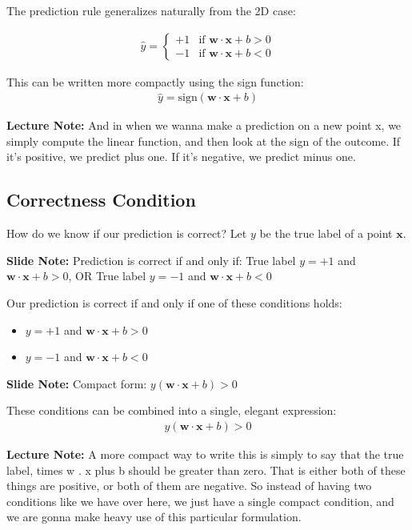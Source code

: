\documentclass{article}
\newcommand{\slidenote}[1]{\begin{mdframed}[backgroundcolor=blue!10, linewidth=0pt]
\textbf{Slide Note:} #1
\end{mdframed}}
\newcommand{\lecturenote}[1]{\begin{mdframed}[backgroundcolor=green!10, linewidth=0pt]
\textbf{Lecture Note:} #1
\end{mdframed}}
\begin{document}
The prediction rule generalizes naturally from the 2D case:

\begin{align}
    \hat{y} = \begin{cases}
    +1 & \text{if } \mathbf{w} \cdot \mathbf{x} + b > 0\\
    -1 & \text{if } \mathbf{w} \cdot \mathbf{x} + b < 0
    \end{cases}
\end{align}

This can be written more compactly using the sign function:
\begin{align}
    \hat{y} = \text{sign}(\mathbf{w} \cdot \mathbf{x} + b)
\end{align}

\lecturenote{And in when we wanna make a prediction on a new point x, we simply compute the linear function, and then look at the sign of the outcome. If it's positive, we predict plus one. If it's negative, we predict minus one.}

\subsection{Correctness Condition}

How do we know if our prediction is correct? Let $y$ be the true label of a point $\mathbf{x}$.

\slidenote{Prediction is correct if and only if: True label $y = +1$ and $\mathbf{w} \cdot \mathbf{x} + b > 0$, OR True label $y = -1$ and $\mathbf{w} \cdot \mathbf{x} + b < 0$}

Our prediction is correct if and only if one of these conditions holds:
\begin{itemize}
    \item $y = +1$ and $\mathbf{w} \cdot \mathbf{x} + b > 0$
    \item $y = -1$ and $\mathbf{w} \cdot \mathbf{x} + b < 0$
\end{itemize}

\slidenote{Compact form: $y(\mathbf{w} \cdot \mathbf{x} + b) > 0$}

These conditions can be combined into a single, elegant expression:
\begin{align}
    y(\mathbf{w} \cdot \mathbf{x} + b) > 0
\end{align}

\lecturenote{A more compact way to write this is simply to say that the true label, times w . x plus b should be greater than zero. That is either both of these things are positive, or both of them are negative. So instead of having two conditions like we have over here, we just have a single compact condition, and we are gonna make heavy use of this particular formulation.}
\end{document}
